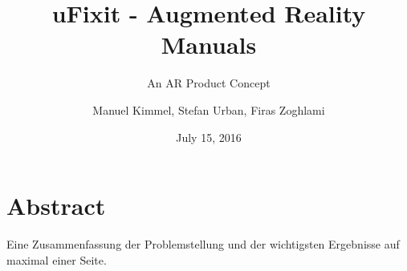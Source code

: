 \documentclass[doctype=Studienarbeit,oneside]{ldvbook}
\begin{document}
\subject{Advanced Seminar}
\title{uFixit - Augmented Reality Manuals}
\subtitle{An AR Product Concept}
\author{Manuel Kimmel, Stefan Urban, Firas Zoghlami}
\date{July 15, 2016}

\maketitle


\chapter*{Abstract}

Eine Zusammenfassung der Problemstellung und der wichtigsten
Ergebnisse auf maximal einer Seite.


\tableofcontents








%
\end{document}
